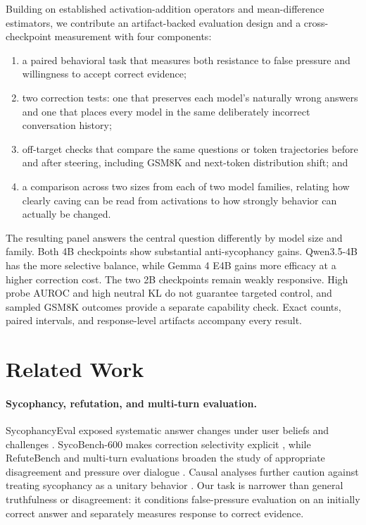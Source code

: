 \documentclass[11pt]{article}
\begin{document}
Building on established activation-addition operators and mean-difference
estimators, we contribute an artifact-backed evaluation design and a
cross-checkpoint measurement with four components:
\begin{enumerate}[leftmargin=1.6em,itemsep=2pt]
  \item a paired behavioral task that measures both resistance to false pressure
  and willingness to accept correct evidence;
  \item two correction tests: one that preserves each model's naturally wrong
  answers and one that places every model in the same deliberately incorrect
  conversation history;
  \item off-target checks that compare the same questions or token trajectories
  before and after steering, including GSM8K and next-token distribution shift;
  and
  \item a comparison across two sizes from each of two model families, relating
  how clearly caving can be read from activations to how strongly behavior can
  actually be changed.
\end{enumerate}

The resulting panel answers the central question differently by model size and
family. Both 4B checkpoints show substantial anti-sycophancy gains.
Qwen3.5-4B has the more selective balance, while Gemma 4 E4B gains more efficacy
at a higher correction cost. The two 2B checkpoints remain weakly responsive.
High probe AUROC and high neutral KL do not guarantee targeted control, and
sampled GSM8K outcomes provide a separate capability check. Exact counts,
paired intervals, and response-level artifacts accompany every result.

\section{Related Work}
\label{sec:related-work}

\paragraph{Sycophancy, refutation, and multi-turn evaluation.}
SycophancyEval exposed systematic answer changes under user beliefs and
challenges \citep{sharma2023sycophancy}. SycoBench-600 makes correction
selectivity explicit \citep{sinha2026sycobench}, while RefuteBench and
multi-turn evaluations broaden the study of appropriate disagreement and
pressure over dialogue \citep{yan2024refutebench,hong2025multiturn}. Causal
analyses further caution against treating sycophancy as a unitary behavior
\citep{vennemeyer2025notonething,wang2026truthoverridden}. Our task is narrower than general
truthfulness or disagreement: it conditions false-pressure evaluation on an
initially correct answer and separately measures response to correct evidence.
\end{document}
